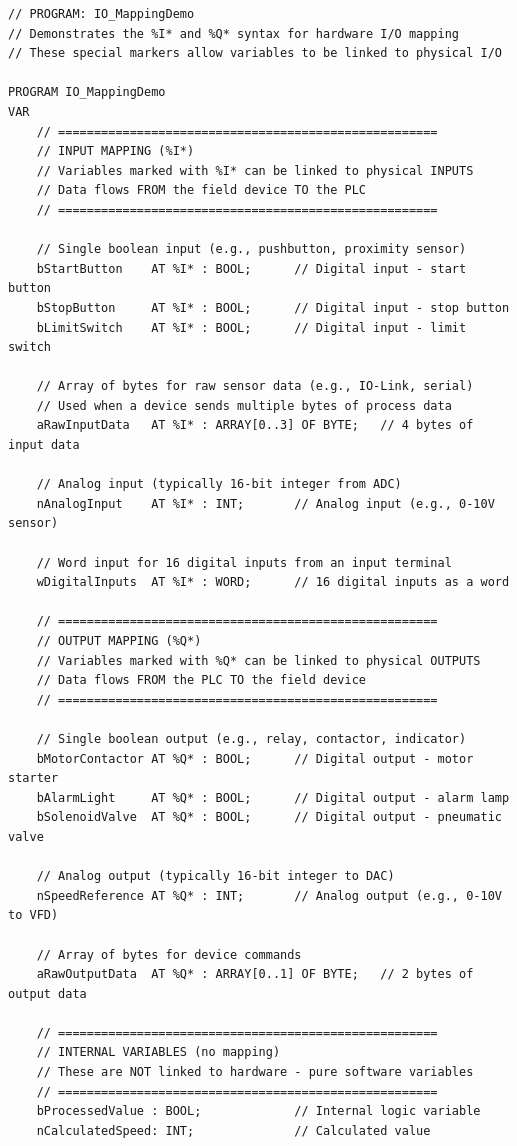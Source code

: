 \documentclass[11pt,a4paper]{article}
\begin{document}
\begin{lstlisting}
// PROGRAM: IO_MappingDemo
// Demonstrates the %I* and %Q* syntax for hardware I/O mapping
// These special markers allow variables to be linked to physical I/O

PROGRAM IO_MappingDemo
VAR
    // =====================================================
    // INPUT MAPPING (%I*)
    // Variables marked with %I* can be linked to physical INPUTS
    // Data flows FROM the field device TO the PLC
    // =====================================================
    
    // Single boolean input (e.g., pushbutton, proximity sensor)
    bStartButton    AT %I* : BOOL;      // Digital input - start button
    bStopButton     AT %I* : BOOL;      // Digital input - stop button
    bLimitSwitch    AT %I* : BOOL;      // Digital input - limit switch
    
    // Array of bytes for raw sensor data (e.g., IO-Link, serial)
    // Used when a device sends multiple bytes of process data
    aRawInputData   AT %I* : ARRAY[0..3] OF BYTE;   // 4 bytes of input data
    
    // Analog input (typically 16-bit integer from ADC)
    nAnalogInput    AT %I* : INT;       // Analog input (e.g., 0-10V sensor)
    
    // Word input for 16 digital inputs from an input terminal
    wDigitalInputs  AT %I* : WORD;      // 16 digital inputs as a word
    
    // =====================================================
    // OUTPUT MAPPING (%Q*)
    // Variables marked with %Q* can be linked to physical OUTPUTS
    // Data flows FROM the PLC TO the field device
    // =====================================================
    
    // Single boolean output (e.g., relay, contactor, indicator)
    bMotorContactor AT %Q* : BOOL;      // Digital output - motor starter
    bAlarmLight     AT %Q* : BOOL;      // Digital output - alarm lamp
    bSolenoidValve  AT %Q* : BOOL;      // Digital output - pneumatic valve
    
    // Analog output (typically 16-bit integer to DAC)
    nSpeedReference AT %Q* : INT;       // Analog output (e.g., 0-10V to VFD)
    
    // Array of bytes for device commands
    aRawOutputData  AT %Q* : ARRAY[0..1] OF BYTE;   // 2 bytes of output data
    
    // =====================================================
    // INTERNAL VARIABLES (no mapping)
    // These are NOT linked to hardware - pure software variables
    // =====================================================
    bProcessedValue : BOOL;             // Internal logic variable
    nCalculatedSpeed: INT;              // Calculated value
    

\end{lstlisting}
\end{document}
